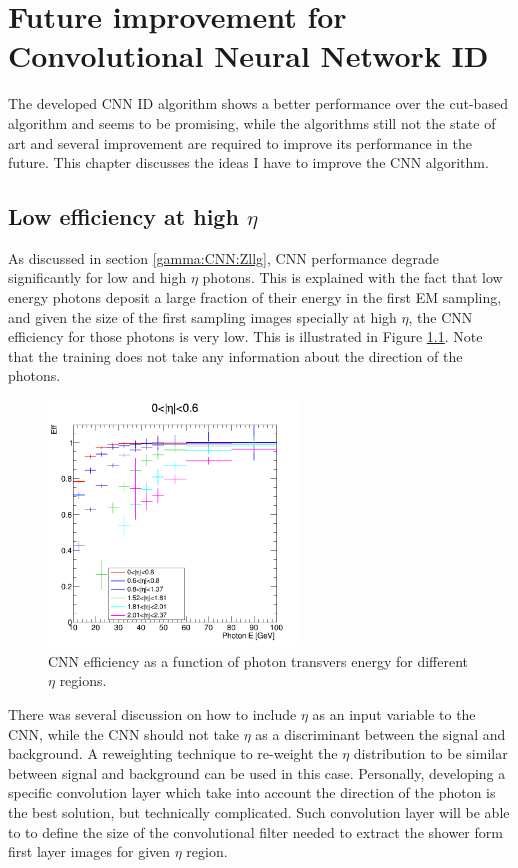 \chapter{Future improvement for Convolutional Neural Network ID}
\label{Adx3}
The developed CNN ID algorithm shows a better performance over the cut-based algorithm and seems to be promising, while the algorithms still not the state of art and several improvement are required to improve its performance in the future. This chapter discusses the ideas I have to improve the CNN algorithm.

\section{Low efficiency at high $\eta$}
\label{Adx3:Eta}

As discussed in section \ref{gamma:CNN:Zllg}, CNN performance degrade significantly for low \pT and high $\eta$ photons. This is explained with the fact that low energy photons deposit a large fraction of their energy in the first EM sampling, and given the size of the first sampling images specially at high $\eta$, the CNN efficiency for those photons is very low. This is illustrated in Figure \ref{fig:Adx3:Eta}. Note that the training does not take any information about the direction of the photons.
\begin{figure}[htbp]
    \centering
    \includegraphics[width=0.6\textwidth]{Adx/Adx3/Img/Eff_vs_Energy.png}
    \caption{CNN efficiency as a function of photon transvers energy for different $\eta$ regions. }
    \label{fig:Adx3:Eta}
\end{figure}

There was several discussion on how to include $\eta$ as an input variable to the CNN, while the CNN should not take $\eta$ as a discriminant between the signal and background. A reweighting technique to re-weight the $\eta$ distribution to be similar between signal and background can be used in this case. Personally, developing a specific convolution layer which take into account the direction of the photon is the best solution, but technically complicated. Such convolution layer will be able to to define the size of the convolutional filter needed to extract the shower form first layer images for given $\eta$ region. \\

